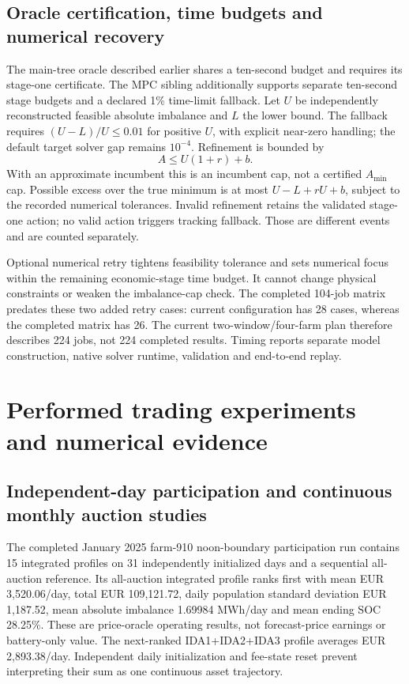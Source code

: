 \subsection{Oracle certification, time budgets and numerical recovery}
The main-tree oracle described earlier shares a ten-second budget and requires
its stage-one certificate. The MPC sibling additionally supports separate
ten-second stage budgets and a declared 1\% time-limit fallback. Let $U$ be
independently reconstructed feasible absolute imbalance and $L$ the lower bound.
The fallback requires $(U-L)/U\le0.01$ for positive $U$, with explicit near-zero
handling; the default target solver gap remains $10^{-4}$. Refinement is bounded by
\begin{equation}
 A\le U(1+r)+b.
\end{equation}
With an approximate incumbent this is an incumbent cap, not a certified
$A_{\min}$ cap. Possible excess over the true minimum is at most
$U-L+rU+b$, subject to the recorded numerical tolerances. Invalid refinement
retains the validated stage-one action; no valid action triggers tracking
fallback. Those are different events and are counted separately.

Optional numerical retry tightens feasibility tolerance and sets numerical focus
within the remaining economic-stage time budget. It cannot change physical
constraints or weaken the imbalance-cap check. The completed 104-job matrix
predates these two added retry cases: current configuration has 28 cases,
whereas the completed matrix has 26. The current two-window/four-farm plan
therefore describes 224 jobs, not 224 completed results. Timing reports separate
model construction, native solver runtime, validation and end-to-end replay.

\clearpage
\section{Performed trading experiments and numerical evidence}
\label{sec:empirical-results}

\subsection{Independent-day participation and continuous monthly auction studies}
The completed January 2025 farm-910 noon-boundary participation run contains
15 integrated profiles on 31 independently initialized days and a sequential
all-auction reference. Its all-auction integrated profile ranks first with
mean EUR 3,520.06/day, total EUR 109,121.72, daily population standard deviation
EUR 1,187.52, mean absolute imbalance 1.69984 MWh/day and mean ending SOC
28.25\%. These are price-oracle operating results, not forecast-price earnings
or battery-only value. The next-ranked IDA1+IDA2+IDA3 profile averages
EUR 2,893.38/day. Independent daily initialization and fee-state reset prevent
interpreting their sum as one continuous asset trajectory.

